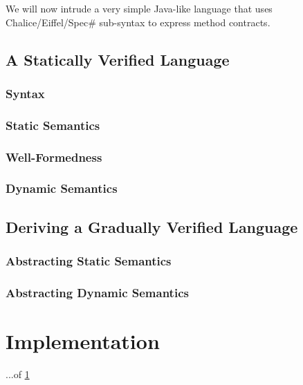 We will now intrude a very simple Java-like language that uses Chalice/Eiffel/Spec\# %
 sub-syntax to express method contracts.


\section{A Statically Verified Language}
\label{sec:a-statically-verified}


\subsection{Syntax}
\label{sec:syntax}


\subsection{Static Semantics}
\label{sec:static-semantics}


\subsection{Well-Formedness}
\label{sec:well-formedness}


\subsection{Dynamic Semantics}


\section{Deriving a Gradually Verified Language}

\subsection{Abstracting Static Semantics}

\subsection{Abstracting Dynamic Semantics}


\chapter{Implementation}
...of \ref{sec:a-statically-verified}

